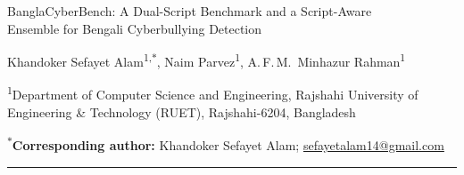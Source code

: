 \documentclass[11pt,a4paper]{article}
\def\texttt#1{#1}%
\def\bfseries{}%
\def\sffamily{}%
\newcommand{\bench}{BanglaCyberBench}
\begin{document}
\thispagestyle{firstpage}

\vspace{0.5em}
{\RaggedRight\sffamily\bfseries\Large\color{black}%
\bench{}: A Dual-Script Benchmark and a Script-Aware\\[1pt]
Ensemble for Bengali Cyberbullying Detection\par}
\vspace{0.6em}

{Khandoker Sefayet Alam\textsuperscript{1,$\ast$},\quad
Naim Parvez\textsuperscript{1},\quad
A.\,F.\,M.~Minhazur Rahman\textsuperscript{1}\par}
\vspace{0.3em}

{\textsuperscript{1}Department of Computer Science and Engineering,
Rajshahi University of Engineering \& Technology (RUET), Rajshahi-6204, Bangladesh\par}
\vspace{0.2em}

{\small\textsuperscript{$\ast$}\textbf{Corresponding author:} Khandoker Sefayet Alam;
\href{mailto:sefayetalam14@gmail.com}{\texttt{sefayetalam14@gmail.com}}\par}

\vspace{0.5em}
{\color{abstractrule}\rule{\linewidth}{0.4pt}}
\vspace{0.3em}
\end{document}
